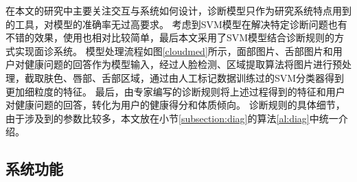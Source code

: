 在本文的研究中主要关注交互与系统如何设计，诊断模型只作为研究系统特点用到的工具，对模型的准确率无过高要求。
考虑到SVM模型在解决特定诊断问题也有不错的效果，使用也相对比较简单，最后本文采用了SVM模型结合诊断规则的方式实现面诊系统。
模型处理流程如图\ref{cloudmed}所示，面部图片、舌部图片和用户对健康问题的回答作为模型输入，经过人脸检测、区域提取算法将图片进行预处理，截取肤色、唇部、舌部区域，通过由人工标记数据训练过的SVM分类器得到更加细粒度的特征。
最后，由专家编写的诊断规则将上述过程得到的特征和用户对健康问题的回答，转化为用户的健康得分和体质倾向。
诊断规则的具体细节，由于涉及到的参数比较多，本文放在小节\ref{subsection:diag}的算法\ref{al:diag}中统一介绍。


\subsection{系统功能}


